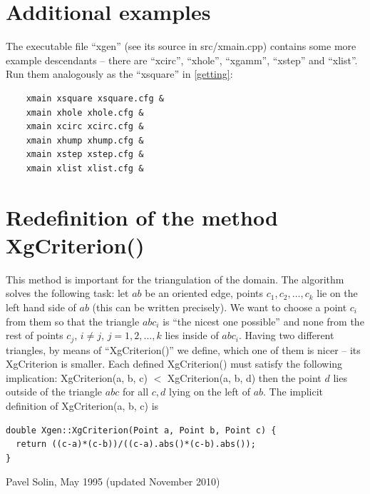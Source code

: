 \documentclass[12pt]{article}
\begin{document}
  \section{Additional examples}

  The executable file ``xgen'' (see its source in src/xmain.cpp) contains
  some more example descendants -- there are ``xcirc'', ``xhole'', ``xgamm'', 
  ``xstep'' and ``xlist''. Run them analogously as the ``xsquare'' in \ref{getting}:
  \begin{verbatim}
    xmain xsquare xsquare.cfg &
    xmain xhole xhole.cfg &
    xmain xcirc xcirc.cfg &
    xmain xhump xhump.cfg &
    xmain xstep xstep.cfg &
    xmain xlist xlist.cfg &
  \end{verbatim}

  \section{Redefinition of the method XgCriterion()}

  This method is important for the triangulation of the domain. The algorithm solves
  the following task: let $ab$ be an oriented edge, points $c_1, c_2, \ldots, c_k$ lie on the left
  hand side of $ab$ (this can be written precisely). We want to choose a point $c_i$ from them
  so that the triangle
  $abc_i$ is ``the nicest one possible'' and none from the rest of points $c_j$, 
  $ i \not= j$, $j = 1, 2, \ldots, k$ lies inside of $abc_i$. Having two different
  triangles, by means of ``XgCriterion()'' we define, which one of them is nicer -- its XgCriterion
  is smaller. Each defined XgCriterion() must satisfy the following implication:
  XgCriterion(a, b, c) $<$ 
  XgCriterion(a, b, d) then the point $d$ lies outside of the triangle $abc$ for all $c, d$ lying
  on the left of $ab$.
  The implicit definition of XgCriterion(a, b, c) is

  \begin{verbatim}
double Xgen::XgCriterion(Point a, Point b, Point c) {
  return ((c-a)*(c-b))/((c-a).abs()*(c-b).abs());
}
  \end{verbatim}
\hbox{} \hfill Pavel Solin, May 1995 (updated November 2010)
\end{document}

